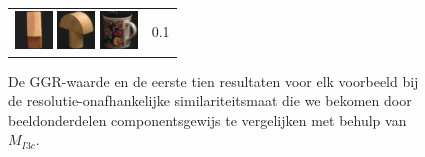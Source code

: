 \begin{figure}[tbp]
\begin{center}
\begin{tabular}{m{11cm} | m{3cm} |}
\includegraphics[width=1cm]{coil/beeld-44.eps}
\includegraphics[width=1cm]{coil/beeld-4.eps}
\includegraphics[width=1cm]{coil/beeld-64.eps}
& {\scriptsize 0.1}
\\
\end{tabular}
\caption{\label{fig:results_beste_multires_pixelgeb}De GGR-waarde en de eerste tien resultaten voor elk voorbeeld bij de resolutie-onafhankelijke similariteitsmaat die we bekomen door beeldonderdelen componentsgewijs te vergelijken met behulp van $M_{I3c}$.}
\end{center}
\end{figure}
